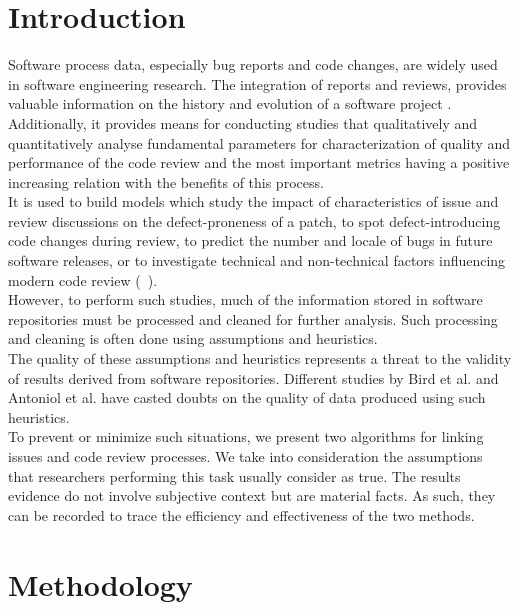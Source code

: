 \documentclass[conference,compsoc]{IEEEtran}
\begin{document}
\section{Introduction}
Software process data, especially bug reports and code
changes, are widely used in software engineering research.
The integration of reports and reviews, provides 
valuable information on the history and evolution of
a software project \cite{1bib}.
\\
Additionally, it provides means for conducting studies that qualitatively 
and quantitatively analyse fundamental parameters for characterization of 
quality and performance of the code review and the
most important metrics having a positive increasing relation
with the benefits of this process.
\\
It is used to build models which study the impact of
characteristics of issue and review discussions on the defect-proneness of 
a patch, to spot defect-introducing code
changes during review, to predict the number and locale of
bugs in future software releases, or to investigate technical
and non-technical factors influencing modern code review 
(~\cite{2bib,3bib,4bib,5bib,6bib,7bib}).
\\
However, to perform such studies, much of the information stored in software repositories must be processed and
cleaned for further analysis. Such processing and cleaning
is often done using assumptions and heuristics.
\\
The quality of these assumptions and heuristics represents 
a threat to the validity of results derived from software
repositories. Different studies by Bird et al. \cite{8bib} and Antoniol
et al. \cite{9bib} have casted doubts on the quality of data produced 
using such heuristics.
\\
To prevent or minimize such situations, we present two algorithms 
for linking issues and code review processes. We 
take into consideration the assumptions that researchers performing 
this task usually consider as true.
The results evidence do not
involve subjective context but are material facts. As such,
they can be recorded to trace the efficiency and effectiveness 
of the two methods.

 

\section{Methodology}
\end{document}
